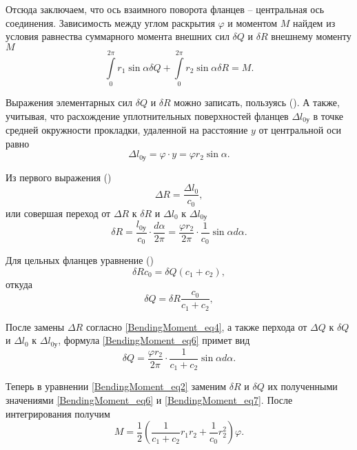 Отсюда заключаем, что ось взаимного поворота фланцев -- центральная ось соединения. 
Зависимость между углом раскрытия $\varphi$ и моментом $M$ найдем из условия равнества суммарного момента внешних сил $\delta Q$ и $\delta R$ внешнему моменту $M$
\begin{equation}
  \label{BendingMoment_eq2}
    \int\limits_{0}^{2 \pi}r_1 \sin{\alpha}\delta Q+\int\limits_{0}^{2 \pi}r_2 \sin{\alpha}\delta R=M.
\end{equation}

Выражения элементарных сил $\delta Q$ и $\delta R$ можно записать, пользуясь (). А также, учитывая, что расхождение уплотнительных поверхностей фланцев $\Delta l_{0 \text{у}}$ в точке средней окружности прокладки, удаленной на расстояние $y$ от центральной оси равно
\begin{equation}
  \label{BendingMoment_eq3}
  \Delta l_{0 \text{у}}= \varphi \cdot y= \varphi r_2 \sin{\alpha}.
\end{equation}

Из первого выражения ()
\begin{equation}
  \label{BendingMoment_eq4}
  \Delta R= \frac{\Delta l_0}{c_0},
\end{equation}
или совершая переход от $\Delta R$ к $\delta R$ и $\Delta l_0$ к $\Delta l_{0 \text{у}}$
\begin{equation}
  \label{BendingMoment_eq5}
  \delta R= \frac{l_{0 \text{у}}}{c_0} \cdot \frac{d \alpha}{2 \pi}= \frac{\varphi r_2}{2 \pi} \cdot \frac{1}{c_0} \sin{\alpha} d\alpha.
\end{equation}

Для цельных фланцев уравнение ()
\begin{equation*}
  \delta R c_0= \delta Q \left(c_1+c_2\right),
\end{equation*}
откуда
\begin{equation}
  \label{BendingMoment_eq6}
  \delta Q= \delta R \frac{c_0}{c_1+c_2},
\end{equation}

После замены $\Delta R$ согласно \eqref{BendingMoment_eq4}, а также перхода от $\Delta Q$ к $\delta Q$ и $\Delta l_0$ к $\Delta l_{0 \text{у}}$, формула \eqref{BendingMoment_eq6} примет вид
\begin{equation}
  \label{BendingMoment_eq7}
  \delta Q=\frac{\varphi r_2}{2 \pi}\cdot \frac{1}{c_1+c_2}\sin{\alpha}d\alpha.
\end{equation}

Теперь в уравнении \eqref{BendingMoment_eq2} заменим $\delta R$ и $\delta Q$ их полученными значениями \eqref{BendingMoment_eq6} и \eqref{BendingMoment_eq7}.
После интегрирования получим 
\begin{equation}
  \label{BendingMoment_eq8}
  M=\frac{1}{2}\left(\frac{1}{c_1+c_2}r_1r_2+\frac{1}{c_0}r_2^2\right)\varphi.
\end{equation}

